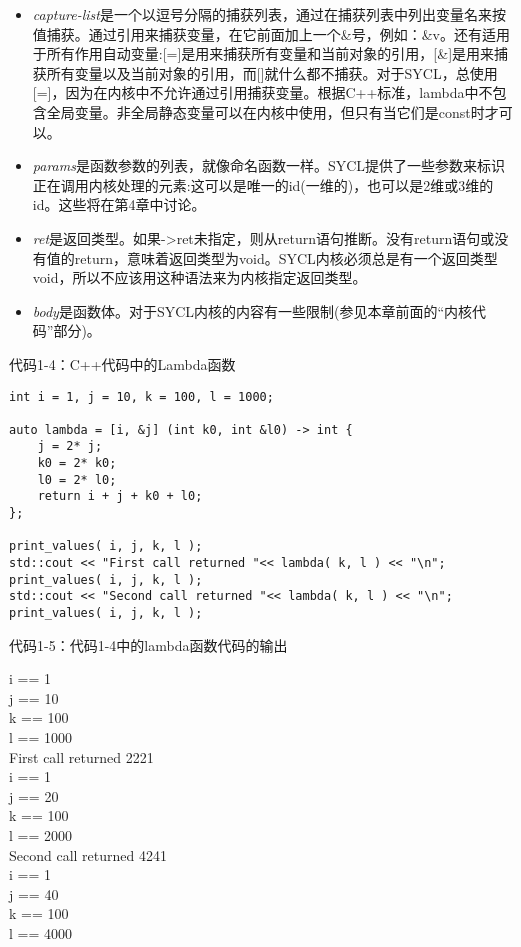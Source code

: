 \begin{itemize}
	\item \textit{capture-list}是一个以逗号分隔的捕获列表，通过在捕获列表中列出变量名来按值捕获。通过引用来捕获变量，在它前面加上一个\&号，例如：\&v。还有适用于所有作用自动变量:[=]是用来捕获所有变量和当前对象的引用，[\&]是用来捕获所有变量以及当前对象的引用，而[]就什么都不捕获。对于SYCL，总使用[=]，因为在内核中不允许通过引用捕获变量。根据C++标准，lambda中不包含全局变量。非全局静态变量可以在内核中使用，但只有当它们是const时才可以。
	\item \textit{params}是函数参数的列表，就像命名函数一样。SYCL提供了一些参数来标识正在调用内核处理的元素:这可以是唯一的id(一维的)，也可以是2维或3维的id。这些将在第4章中讨论。
	\item \textit{ret}是返回类型。如果->ret未指定，则从return语句推断。没有return语句或没有值的return，意味着返回类型为void。SYCL内核必须总是有一个返回类型void，所以不应该用这种语法来为内核指定返回类型。
	\item \textit{body}是函数体。对于SYCL内核的内容有一些限制(参见本章前面的“内核代码”部分)。
\end{itemize}

代码1-4：C++代码中的Lambda函数
\begin{lstlisting}[caption={}]
int i = 1, j = 10, k = 100, l = 1000;

auto lambda = [i, &j] (int k0, int &l0) -> int {
	j = 2* j;
	k0 = 2* k0;
	l0 = 2* l0;
	return i + j + k0 + l0;
};

print_values( i, j, k, l );
std::cout << "First call returned "<< lambda( k, l ) << "\n";
print_values( i, j, k, l );
std::cout << "Second call returned "<< lambda( k, l ) << "\n";
print_values( i, j, k, l );
\end{lstlisting}

代码1-5：代码1-4中的lambda函数代码的输出
\begin{tcolorbox}[colback=white,colframe=black]
i == 1 \\
j == 10 \\
k == 100 \\
l == 1000 \\
First call returned 2221 \\
i == 1 \\
j == 20 \\
k == 100 \\
l == 2000 \\
Second call returned 4241 \\
i == 1 \\
j == 40 \\
k == 100 \\
l == 4000 
\end{tcolorbox}

